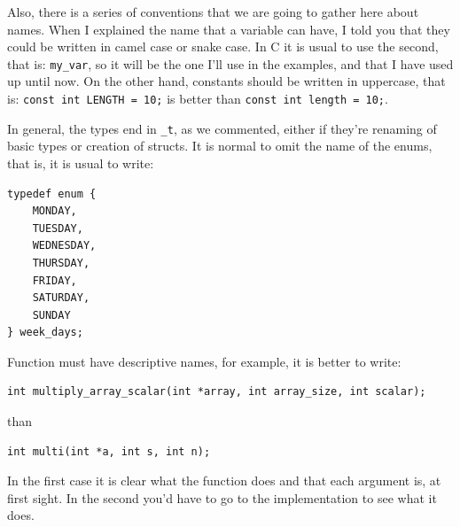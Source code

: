 \documentclass[a4paper]{article}
\begin{document}
Also, there is a series of conventions that we are going to gather here about
names. When I explained the name that a variable can have, I told you that they
could be written in camel case or snake case. In C it is usual to use the
second, that is: \verb!my_var!, so it will be the one I'll use in the examples,
and that I have used up until now. On the other hand, constants
should be written in uppercase, that is:
\lstinline[style=C]!const int LENGTH = 10;! is better than
\lstinline[style=C]!const int length = 10;!.

In general, the types end in \verb!_t!, as we commented, either if they're
renaming of basic types or creation of structs. It is normal to omit the name
of the enums, that is, it is usual to write:

\noindent
\begin{minipage}[H]{\linewidth}
\mbox{}
\begin{lstlisting}[style=C,
caption={Example of a enum with typedef},
label={lst:typedefEnum}]
typedef enum {
    MONDAY,
    TUESDAY,
    WEDNESDAY,
    THURSDAY,
    FRIDAY,
    SATURDAY,
    SUNDAY
} week_days;
\end{lstlisting}
\end{minipage}

Function must have descriptive names, for example, it is better to write:

\noindent
\begin{minipage}[H]{\linewidth}
\mbox{}
\begin{lstlisting}[style=C,
caption={Example of descriptive function},
label={lst:descriptiveFunction}]
int multiply_array_scalar(int *array, int array_size, int scalar);
\end{lstlisting}
\end{minipage}

than

\noindent
\begin{minipage}[H]{\linewidth}
\mbox{}
\begin{lstlisting}[style=C,
caption={Example of non-descriptive function},
label={lst:nonDescriptiveFunction}]
int multi(int *a, int s, int n);
\end{lstlisting}
\end{minipage}

In the first case it is clear what the function does and that each argument is,
at first sight. In the second you'd have to go to the implementation to see what
it does.
\end{document}
